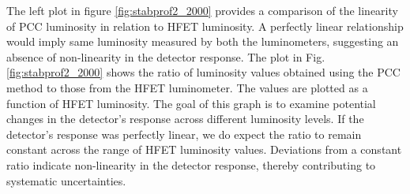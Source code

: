 \begin{itemize}

  

The left plot in figure \ref{fig:stabprof2_2000} provides a comparison of the linearity of PCC luminosity in relation to HFET luminosity. A perfectly linear relationship would imply same luminosity measured by both the luminometers, suggesting an absence of non-linearity in the detector response. The plot in Fig. \ref{fig:stabprof2_2000} shows the ratio of luminosity values obtained using the PCC method to those from the HFET luminometer. The values are plotted as a function of HFET luminosity. The goal of this graph is to examine potential changes in the detector's response across different luminosity levels. If the detector's response was perfectly linear, we do expect the ratio to remain constant across the range of HFET luminosity values. Deviations from a constant ratio indicate non-linearity in the detector response, thereby contributing to systematic uncertainties.


\end{itemize}
